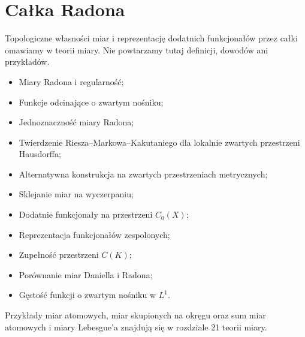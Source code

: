 \providecommand{\atlasref}[2]{#2}
\section{Całka Radona}

Topologiczne własności miar i reprezentację dodatnich
funkcjonałów przez całki omawiamy w teorii miary.
Nie powtarzamy tutaj definicji, dowodów ani przykładów.

\begin{itemize}
 \item \atlasref{ME-20::def:radon-measure-20}{Miary Radona i regularność};
 \item \atlasref{ME-20::lem:cutoff-radon-20}{Funkcje odcinające o zwartym nośniku};
 \item \atlasref{ME-20::thm:uniqueness-cc-20}{Jednoznaczność miary Radona};
 \item \atlasref{ME-21::thm:riesz-positive-21}{Twierdzenie Riesza--Markowa--Kakutaniego dla lokalnie zwartych przestrzeni Hausdorffa};
 \item \atlasref{ME-21::thm:compact-riesz-21}{Alternatywna konstrukcja na zwartych przestrzeniach metrycznych};
 \item \atlasref{ME-21::eq:gluing-measures-21}{Sklejanie miar na wyczerpaniu};
 \item \atlasref{ME-21::thm:riesz-c0-positive-21}{Dodatnie funkcjonały na przestrzeni $C_0(X)$};
 \item \atlasref{ME-21::thm:riesz-complex-21}{Reprezentacja funkcjonałów zespolonych};
 \item \atlasref{FA-12::prop:ck-banach12}{Zupełność przestrzeni $C(K)$};
 \item \atlasref{ME-32::it:thm:daniell-radon-comparison}{Porównanie miar Daniella i Radona};
 \item \atlasref{ME-32::it:cor:radon-cc-l1-general}{Gęstość funkcji o zwartym nośniku w $L^1$}.
\end{itemize}
Przykłady miar atomowych, miar skupionych na okręgu
oraz sum miar atomowych i miary Lebesgue'a znajdują się w
\atlasref{ME-21::ch:riesz-markov-21}{rozdziale 21 teorii miary}.
